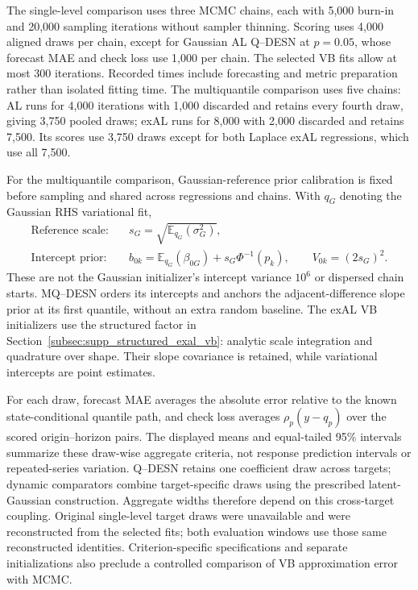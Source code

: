 \documentclass[12pt,letterpaper]{article}
\newcommand{\E}{\mathbb{E}}
\numberwithin{suppalgorithm}{section}
\numberwithin{equation}{section}
\numberwithin{table}{section}
\numberwithin{figure}{section}
\begin{document}
The single-level comparison uses three MCMC chains, each with 5,000
burn-in and 20,000 sampling iterations without sampler thinning. Scoring
uses 4,000 aligned draws per chain, except for Gaussian AL Q--DESN at
\(p=0.05\), whose forecast MAE and check loss use 1,000 per chain.
The selected VB fits allow at most 300 iterations. Recorded times include
forecasting and metric preparation rather than isolated fitting time.
The multiquantile comparison uses five chains: AL runs for 4,000
iterations with 1,000 discarded and retains every fourth draw, giving
3,750 pooled draws; exAL runs for 8,000 with 2,000 discarded and retains
7,500. Its scores use 3,750 draws except for both Laplace exAL regressions,
which use all 7,500.

For the multiquantile comparison, Gaussian-reference prior calibration is
fixed before sampling and shared across regressions and chains. With
\(q_G\) denoting the Gaussian RHS variational fit,
\begin{equation}
\begin{aligned}
\text{Reference scale:}\quad&s_G=\sqrt{\E_{q_G}(\sigma_G^2)},\\
\text{Intercept prior:}\quad&b_{0k}=\E_{q_G}(\beta_{0G})+s_G\Phi^{-1}(p_k),
\qquad V_{0k}=(2s_G)^2.
\end{aligned}
\label{eq:supp-joint-intercept-calibration}
\end{equation}
These are not the Gaussian initializer's intercept variance \(10^6\) or
dispersed chain starts. MQ--DESN orders its intercepts and anchors the
adjacent-difference slope prior at its first quantile, without an extra
random baseline. The exAL VB initializers use the structured factor in
Section~\ref{subsec:supp_structured_exal_vb}: analytic scale integration
and quadrature over shape. Their slope covariance is retained, while
variational intercepts are point estimates.

For each draw, forecast MAE averages the absolute error relative to the
known state-conditional quantile path, and check loss averages
\(\rho_p(y-q_p)\) over the scored origin--horizon pairs. The displayed
means and equal-tailed 95\% intervals summarize these draw-wise aggregate
criteria, not response prediction intervals or repeated-series variation.
Q--DESN retains one coefficient draw across targets; dynamic comparators
combine target-specific draws using the prescribed latent-Gaussian
construction. Aggregate widths therefore depend on this cross-target
coupling. Original single-level target draws were unavailable and were
reconstructed from the selected fits; both evaluation windows use those
same reconstructed identities. Criterion-specific specifications and
separate initializations also preclude a controlled comparison of VB
approximation error with MCMC.
\end{document}
